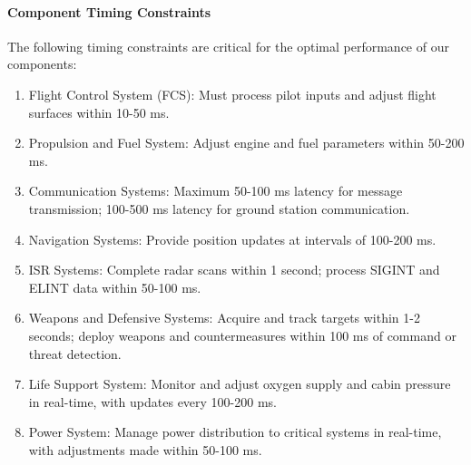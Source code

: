 \documentclass[a4paper,11pt]{article}
\begin{document}
	\paragraph{Component Timing Constraints}
	The following timing constraints are critical for the optimal performance of our components:
	\begin{enumerate}[label=C\arabic*)]
		\item Flight Control System (FCS): Must process pilot inputs and adjust flight surfaces within 10-50 ms.
		\item Propulsion and Fuel System: Adjust engine and fuel parameters within 50-200 ms.
		\item Communication Systems: Maximum 50-100 ms latency for message transmission; 100-500 ms latency for ground station communication.
		\item Navigation Systems: Provide position updates at intervals of 100-200 ms.
		\item ISR Systems: Complete radar scans within 1 second; process SIGINT and ELINT data within 50-100 ms.
		\item Weapons and Defensive Systems: Acquire and track targets within 1-2 seconds; deploy weapons and countermeasures within 100 ms of command or threat detection.
		\item Life Support System: Monitor and adjust oxygen supply and cabin pressure in real-time, with updates every 100-200 ms.
		\item Power System: Manage power distribution to critical systems in real-time, with adjustments made within 50-100 ms.
	\end{enumerate}
\end{document}
